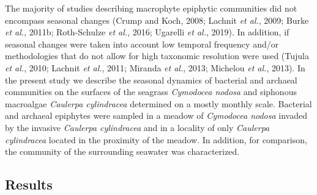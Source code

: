 \documentclass[12pt,]{article}
\begin{document}
The majority of studies describing macrophyte epiphytic communities did
not encompass seasonal changes (Crump and Koch, 2008; Lachnit \emph{et
al.}, 2009; Burke \emph{et al.}, 2011b; Roth-Schulze \emph{et al.},
2016; Ugarelli \emph{et al.}, 2019). In addition, if seasonal changes
were taken into account low temporal frequency and/or methodologies that
do not allow for high taxonomic resolution were used (Tujula \emph{et
al.}, 2010; Lachnit \emph{et al.}, 2011; Miranda \emph{et al.}, 2013;
Michelou \emph{et al.}, 2013). In the present study we describe the
seasonal dynamics of bacterial and archaeal communities on the surfaces
of the seagrass \emph{Cymodocea nodosa} and siphonous macroalgae
\emph{Caulerpa cylindracea} determined on a mostly monthly scale.
Bacterial and archaeal epiphytes were sampled in a meadow of
\emph{Cymodocea nodosa} invaded by the invasive \emph{Caulerpa
cylindracea} and in a locality of only \emph{Caulerpa cylindracea}
located in the proximity of the meadow. In addition, for comparison, the
community of the surrounding seawater was characterized.

\newpage

\hypertarget{results}{%
\subsection{Results}\label{results}}
\end{document}
